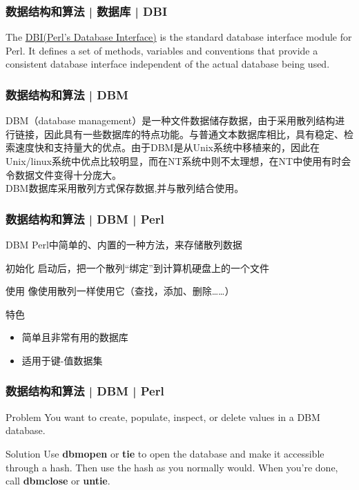 \begin{frame}
  \frametitle{数据结构和算法 | 数据库 | DBI}
  The \href{http://dbi.perl.org/}{DBI(Perl's Database Interface)} is the standard database interface module for Perl. It defines a set of methods, variables and conventions that provide a consistent database interface independent of the actual database being used. 
\end{frame}

\begin{frame}
  \frametitle{数据结构和算法 | DBM}
  DBM（database management）是一种文件数据储存数据，由于采用散列结构进行链接，因此具有一些数据库的特点功能。与普通文本数据库相比，具有稳定、检索速度快和支持量大的优点。由于DBM是从Unix系统中移植来的，因此在Unix/linux系统中优点比较明显，而在NT系统中则不太理想，在NT中使用有时会令数据文件变得十分庞大。\\
  \vspace{1em}
  DBM数据库采用散列方式保存数据,并与散列结合使用。 
\end{frame}

\begin{frame}
  \frametitle{数据结构和算法 | DBM | Perl}
  \begin{block}{DBM}
    Perl中简单的、内置的一种方法，来存储散列数据
  \end{block}
  \pause
  \begin{block}{初始化}
    启动后，把一个散列“绑定”到计算机硬盘上的一个文件
  \end{block}
  \pause
  \begin{block}{使用}
    像使用散列一样使用它（查找，添加、删除……）
  \end{block}
  \pause
  \begin{block}{特色}
    \begin{itemize}
      \item 简单且非常有用的数据库
      \item 适用于键-值数据集
    \end{itemize}
  \end{block}
\end{frame}

\begin{frame}
  \frametitle{数据结构和算法 | DBM | Perl}
  \begin{block}{Problem}
    You want to create, populate, inspect, or delete values in a DBM database.
  \end{block}
  \pause
  \begin{block}{Solution}
    Use \textbf{dbmopen} or \textbf{tie} to open the database and make it accessible through a hash. Then use the hash as you normally would. When you're done, call \textbf{dbmclose} or \textbf{untie}.
  \end{block}
\end{frame}

